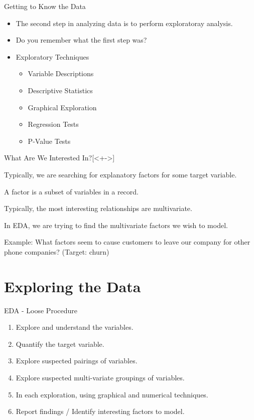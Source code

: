 \documentclass[handout]{beamer}
\begin{document}
\begin{frame}{Getting to Know the Data}
\begin{itemize}[<+->]
   \item The second step in analyzing data is to perform exploratoray analysis.
   \item Do you remember what the first step was?
   \item Exploratory Techniques
   \begin{itemize}
        \item Variable Descriptions
        \item Descriptive Statistics
        \item Graphical Exploration
        \item Regression Tests
        \item P-Value Tests
   \end{itemize}
\end{itemize}
\end{frame}

\begin{frame}{What Are We Interested In?}[<+->]
    \item Typically, we are searching for explanatory factors for some target variable.
    \item A factor is a subset of variables in a record.
    \item Typically, the most interesting relationships are multivariate.
    \item In EDA, we are trying to find the multivariate factors we wish to model.
    \item Example: What factors seem to cause customers to leave our company for other
        phone companies? (Target: churn)
\end{frame}



\section{Exploring the Data}
\begin{frame}{EDA - Loose Procedure}
\begin{enumerate}[<+->]
    \item Explore and understand the variables.
    \item Quantify the target variable.
    \item Explore suspected pairings of variables.
    \item Explore suspected multi-variate groupings of variables.
    \item In each exploration, using graphical and numerical techniques.
    \item Report findings / Identify interesting factors to model.
\end{enumerate}    
\end{frame}
\end{document}
